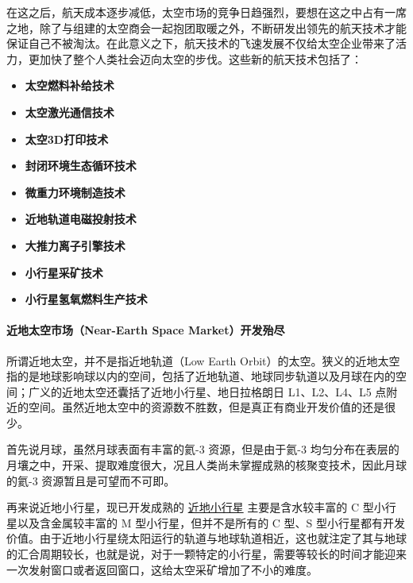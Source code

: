 \documentclass[letterpaper,10pt]{sphinxmanual}
\begin{document}
在这之后，航天成本逐步减低，太空市场的竞争日趋强烈，要想在这之中占有一席之地，除了与组建的太空商会一起抱团取暖之外，不断研发出领先的航天技术才能保证自己不被淘汰。在此意义之下，航天技术的飞速发展不仅给太空企业带来了活力，更加快了整个人类社会迈向太空的步伐。这些新的航天技术包括了：
\begin{itemize}
\item {} 
\textbf{太空燃料补给技术}

\item {} 
\textbf{太空激光通信技术}

\item {} 
\textbf{太空3D打印技术}

\item {} 
\textbf{封闭环境生态循环技术}

\item {} 
\textbf{微重力环境制造技术}

\item {} 
\textbf{近地轨道电磁投射技术}

\item {} 
\textbf{大推力离子引擎技术}

\item {} 
\textbf{小行星采矿技术}

\item {} 
\textbf{小行星氢氧燃料生产技术}

\end{itemize}


\paragraph{近地太空市场（Near-Earth Space Market）开发殆尽}
\label{history:near-earth-space-market}
所谓近地太空，并不是指近地轨道（Low Earth Orbit）的太空。狭义的近地太空指的是地球影响球以内的空间，包括了近地轨道、地球同步轨道以及月球在内的空间；广义的近地太空还囊括了近地小行星、地日拉格朗日 L1、L2、L4、L5 点附近的空间。虽然近地太空中的资源数不胜数，但是真正有商业开发价值的还是很少。
\begin{figure}[htbp]
\centering
\end{figure}

首先说月球，虽然月球表面有丰富的氦-3 资源，但是由于氦-3 均匀分布在表层的月壤之中，开采、提取难度很大，况且人类尚未掌握成熟的核聚变技术，因此月球的氦-3 资源暂且是可望而不可即。

再来说近地小行星，现已开发成熟的 \href{http://en.wikipedia.org/wiki/Near-Earth\_object\#Near-Earth\_asteroids}{近地小行星} 主要是含水较丰富的 C 型小行星以及含金属较丰富的 M 型小行星，但并不是所有的 C 型、S 型小行星都有开发价值。由于近地小行星绕太阳运行的轨道与地球轨道相近，这也就注定了其与地球的汇合周期较长，也就是说，对于一颗特定的小行星，需要等较长的时间才能迎来一次发射窗口或者返回窗口，这给太空采矿增加了不小的难度。
\end{document}
